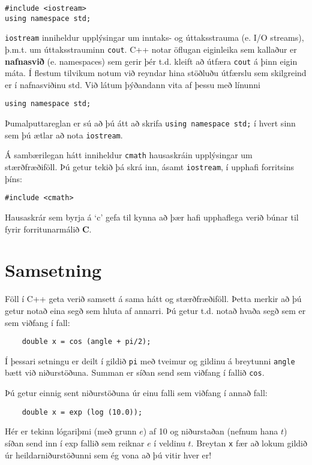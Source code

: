 \begin{verbatim}
#include <iostream>
using namespace std;
\end{verbatim}
%
{\tt iostream} inniheldur upplýsingar um inntaks- og úttaksstrauma (e. I/O streams), þ.m.t. um úttaksstrauminn {\tt cout}.
C++ notar öflugan eiginleika sem kallaður er {\bf nafnasvið} (e. namespaces) sem gerir þér t.d. kleift að útfæra {\tt cout} á þinn eigin máta.
Í flestum tilvikum notum við reyndar hina stöðluðu útfærslu sem skilgreind er í nafnasviðinu std.
Við látum þýðandann vita af þessu með línunni

\begin{verbatim}
using namespace std;
\end{verbatim}

Þumalputtareglan er sú að þú átt að skrifa {\tt using namespace std;} í hvert sinn sem þú ætlar að nota {\tt iostream}.


Á sambærilegan hátt inniheldur {\tt cmath} hausaskráin upplýsingar um stærðfræðiföll.
Þú getur tekið þá skrá inn, ásamt {\tt iostream}, í upphafi forritsins þíns: 

\begin{verbatim}
#include <cmath>
\end{verbatim}

Hausaskrár sem byrja á `c' gefa til kynna að þær hafi upphaflega verið búnar til fyrir forritunarmálið {\bf C}.

\section {Samsetning}
\label{composition}

Föll í C++ geta verið samsett á sama hátt og stærðfræðiföll.
Þetta merkir að þú getur notað eina segð sem hluta af annarri.
Þú getur t.d. notað hvaða segð sem er sem viðfang í fall:

\begin{verbatim}
    double x = cos (angle + pi/2);
\end{verbatim}
%
Í þessari setningu er deilt í gildið {\tt pi} með tveimur og gildinu á breytunni {\tt angle} bætt við niðurstöðuna.
Summan er síðan send sem viðfang í fallið {\tt cos}.

Þú getur einnig sent niðurstöðuna úr einu falli sem viðfang í annað fall:

\begin{verbatim}
    double x = exp (log (10.0));
\end{verbatim}
%
Hér er tekinn lógariþmi (með grunn $e$) af 10 og niðurstaðan (nefnum hana $t$) síðan send inn í exp fallið sem reiknar $e$ í veldinu $t$.
Breytan {\tt x} fær að lokum gildið úr heildarniðurstöðunni sem ég vona að þú vitir hver er!

